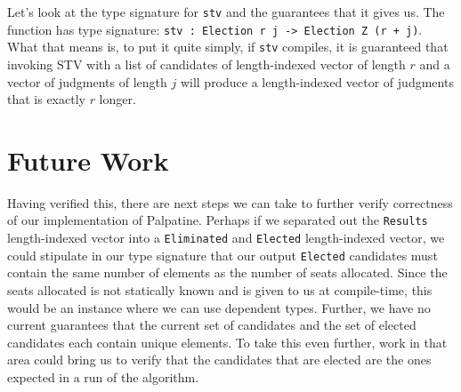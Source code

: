 Let's look at the type signature for \texttt{stv} and the guarantees that it
gives us. The function has type signature: \texttt{stv : Election r j ->
Election Z (r + j)}. What that means is, to put it quite simply, if \texttt{stv}
compiles, it is guaranteed that invoking STV with a list of candidates of
length-indexed vector of length $r$ and a vector of judgments of length $j$ will
produce a length-indexed vector of judgments that is exactly $r$ longer. 

\section{Future Work}

Having verified this, there are next steps we can take to further verify
correctness of our implementation of Palpatine. Perhaps if we separated out the
\texttt{Results} length-indexed vector into a \texttt{Eliminated} and
\texttt{Elected} length-indexed vector, we could stipulate in our type signature
that our output \texttt{Elected} candidates must contain the same number of
elements as the number of seats allocated. Since the seats allocated is not
statically known and is given to us at compile-time, this would be an instance
where we can use dependent types. Further, we have no current guarantees that
the current set of candidates and the set of elected candidates each contain
unique elements. To take this even further, work in that area could bring us to
verify that the candidates that are elected are the ones expected in a run of
the algorithm. 